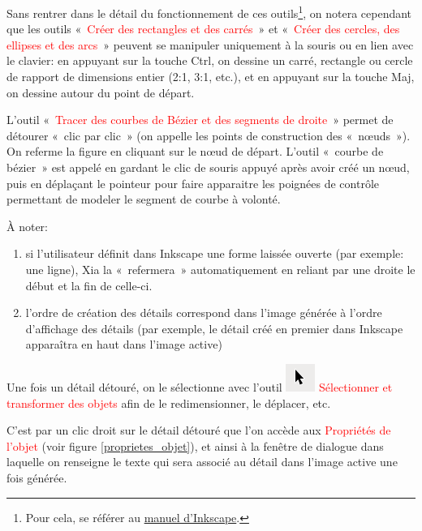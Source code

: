 \documentclass[a4paper,12pt]{report}
\newcommand{\chemin}[1]{\textcolor{red}{#1}}
\begin{document}
Sans rentrer dans le détail du fonctionnement de ces outils\footnote{Pour cela, 
se référer au \href{http://inkscape.org/doc/shapes/tutorial-shapes.fr.html}{manuel d'Inkscape}.}, on notera cependant que
les outils «~\chemin{Créer des rectangles et des carrés}~» et «~\chemin{Créer des cercles, des ellipses et des arcs}~»
 peuvent se manipuler uniquement à la souris ou en lien avec le clavier: en appuyant sur la touche Ctrl, on 
 dessine un carré, rectangle ou cercle de rapport de dimensions entier (2:1, 3:1, etc.),
 et en appuyant sur la touche Maj, on dessine autour du point de départ.

L'outil «~\chemin{Tracer des courbes de Bézier et des segments de droite}~» permet de détourer «~clic par clic~»
(on appelle les points de construction des «~nœuds~»).
On referme la figure en cliquant sur le nœud de départ.
L'outil «~courbe de bézier~» est appelé en gardant le clic de souris appuyé après avoir créé un nœud, 
puis en déplaçant le pointeur pour faire apparaitre les poignées de contrôle permettant de modeler
le segment de courbe à volonté.

À noter:
\begin{enumerate}
 \item si l'utilisateur définit dans Inkscape une forme laissée ouverte (par exemple: une ligne),
Xia la «~refermera~» automatiquement en reliant par une droite le début et la fin de celle-ci.
 \item l'ordre de création des détails correspond dans l'image générée à l'ordre d'affichage des détails
 (par exemple, le détail créé en premier dans Inkscape apparaîtra en haut dans l'image active)
\end{enumerate}

Une fois un détail détouré, on le sélectionne avec l'outil \includegraphics[scale=0.5]{./images/selection}
\chemin{Sélectionner et transformer des objets} afin de le redimensionner, le déplacer, etc.

C'est par un clic droit sur le détail détouré que l'on accède aux \chemin{Propriétés de l'objet} (voir figure \ref{proprietes_objet}),
et ainsi à la fenêtre de dialogue dans laquelle on renseigne le texte qui sera associé au détail dans l'image active
une fois générée.
\end{document}
